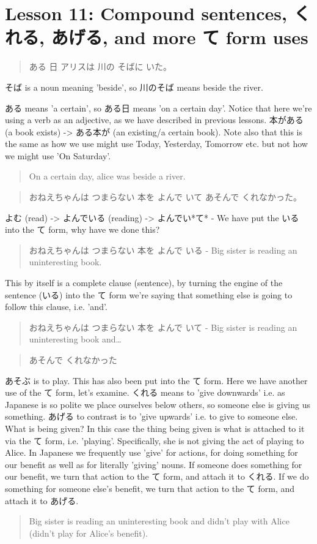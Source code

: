\documentclass[11pt]{article}
\begin{document}
\section{Lesson 11: Compound sentences, くれる, あげる, and more て form uses}
\label{sec:orgfa4014f}
\begin{quote}
ある 日 アリスは 川の そばに いた。
\end{quote}
そば is a noun meaning 'beside', so 川のそば means beside the river.

ある means 'a certain', so ある日 means 'on a certain day'. Notice that here we're using a verb as an adjective, as we have described in previous lessons. 本がある (a book exists) -> ある本が (an existing/a certain book). Note also that this is the same as how we use might use Today, Yesterday, Tomorrow etc. but not how we might use 'On Saturday'.
\begin{quote}
On a certain day, alice was beside a river.
\end{quote}

\begin{quote}
おねえちゃんは つまらない 本を よんで いて あそんで くれなかった。
\end{quote}
よむ (read) -> よんでいる (reading) -> よんでい*て* - We have put the いる into the て form, why have we done this?
\begin{quote}
おねえちゃんは つまらない 本を よんで いる - Big sister is reading an uninteresting book.
\end{quote}
This by itself is a complete clause (sentence), by turning the engine of the sentence (いる) into the て form we're saying that something else is going to follow this clause, i.e. 'and'.
\begin{quote}
おねえちゃんは つまらない 本を よんで いて - Big sister is reading an uninteresting book and\ldots{}
\end{quote}
\begin{quote}
あそんで くれなかった
\end{quote}
あそぶ is to play. This has also been put into the て form. Here we have another use of the て form, let's examine. くれる means to 'give downwards' i.e. as Japanese is so polite we place ourselves below others, so someone else is giving us something. あげる to contrast is to 'give upwards' i.e. to give to someone else. What is being given? In this case the thing being given is what is attached to it via the て form, i.e. 'playing'. Specifically, she is not giving the act of playing to Alice. In Japanese we frequently use 'give' for actions, for doing something for our benefit as well as for literally 'giving' nouns. If someone does something for our benefit, we turn that action to the て form, and attach it to くれる. If we do something for someone else's benefit, we turn that action to the て form, and attach it to あげる.
\begin{quote}
Big sister is reading an uninteresting book and didn't play with Alice (didn't play for Alice's benefit).
\end{quote}
\end{document}
